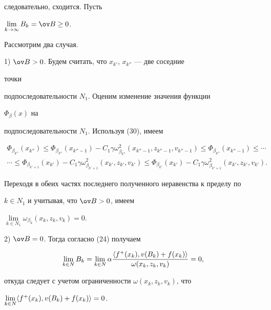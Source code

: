 \begin{pf}
следовательно, сходится. Пусть 


$\lim\limits_{k\to\infty}B_k=\ov B\ge 0$. 


Рассмотрим два случая. 


 


1) $\ov B>0$. Будем считать, что $x_{k'}$, $x_{k''}$ --- две соседние 


точки 


подпоследовательности $N_1$. Оценим изменение значения функции 


$\Phi_\beta(x)$ на 


подпоследовательности $N_1$. Используя (30), имеем 


\begin{multline*} 


\Phi_{\beta_{k''}}(x_{k''})\le\Phi_{\beta_{k''}} 


(x_{k''-1})-C_1\gamma\omega^2_{\beta_{k''}} 


(x_{k''-1},z_{k''-1},v_{k''-1})\le 


\Phi_{\beta_{k''}}(x_{k''-1})\le\dotsb \\ 


\dotsb\le\Phi_{\beta_{k'+1}}(x_{k'})- 


C_1\gamma\omega^2_{\beta_{k'+1}}(x_{k'},z_{k'},v_{k'})\le 


\Phi_{\beta_{k'}}(x_{k'})- 


C_1\gamma\omega^2_{\beta_{k'+1}}(x_{k'},z_{k'},v_{k'}). 


\end{multline*} 


Переходя в обеих частях последнего полученного неравенства к пределу по 


$k\in N_1$ и учитывая, что $\ov B>0$, имеем 


$\lim\limits_{k\in N_1}\omega_{\beta_k}(x_k,z_k,v_k)=0$. 


 


2) $\ov B=0$. Тогда согласно (24) получаем 


$$ 


\lim_{k\in N}B_k=\lim_{k\in N}\alpha 


\frac{\la f^+(x_k),v(B_k)+f(x_k)\ra} 


{\omega(x_k,z_k,v_k)}=0, 


$$ 


откуда следует с учетом ограниченности $\omega(x_k,z_k,v_k)$, что 


$\lim\limits_{k\in N}\langle f^+(x_k),v(B_k)+f(x_k)\rangle=0$. 



\end{pf}

